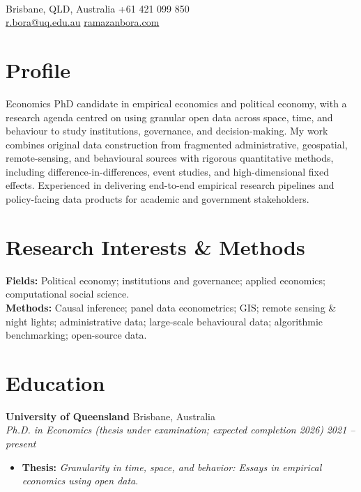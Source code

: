 \documentclass[11pt,a4paper]{article}
\newcommand{\entry}[4]{
    \noindent \textbf{#1} \hfill {\color{secondary}#2} \\
    \textit{#3} \hfill \textit{\color{secondary}#4}\vspace{1mm}
}
\begin{document}
 \\[4pt]
Brisbane, QLD, Australia \hfill +61 421 099 850 \\
\href{mailto:r.bora@uq.edu.au}{r.bora@uq.edu.au} \hfill \href{https://ramazanbora.com}{ramazanbora.com} \\[-2pt]

\vspace{3mm}

\section{Profile}

Economics PhD candidate in empirical economics and political economy, with a research agenda centred on using granular open data across space, time, and behaviour to study institutions, governance, and decision-making. My work combines original data construction from fragmented administrative, geospatial, remote-sensing, and behavioural sources with rigorous quantitative methods, including difference-in-differences, event studies, and high-dimensional fixed effects. Experienced in delivering end-to-end empirical research pipelines and policy-facing data products for academic and government stakeholders.

\section{Research Interests \& Methods}
\textbf{Fields:} Political economy; institutions and governance; applied economics; computational social science. \\
\textbf{Methods:} Causal inference; panel data econometrics; GIS; remote sensing \& night lights; administrative data; large-scale behavioural data; algorithmic benchmarking; open-source data.

\section{Education}

\entry{University of Queensland}{Brisbane, Australia}{Ph.D. in Economics (thesis under examination; expected completion 2026)}{2021 -- present}
\begin{itemize}
    \item \textbf{Thesis:} \textit{Granularity in time, space, and behavior: Essays in empirical economics using open data}.
\end{itemize}
\end{document}
